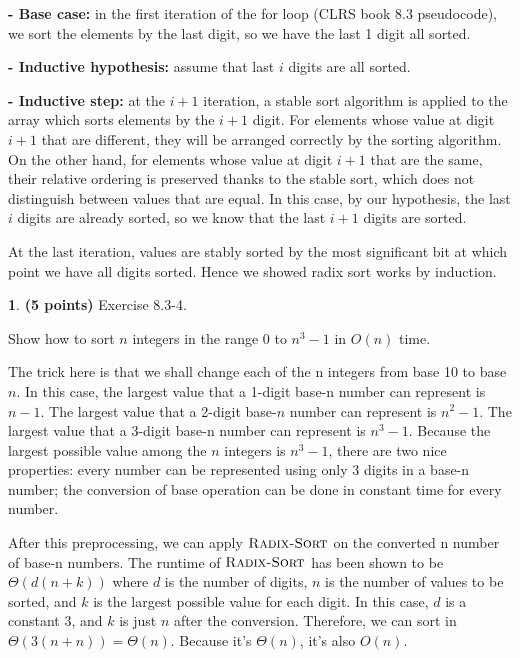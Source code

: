 \documentclass[11pt]{article}
\theoremstyle{definition}
\theoremstyle{theorem}
\newtheorem{prob}{}
\newcommand{\solution}{\medskip\noindent{\color{DarkBlue}\textbf{Solution:}}}
\begin{document}
\solution

\textbf{- Base case:} in the first iteration of the for loop (CLRS book 8.3 pseudocode), we sort the elements by the last digit, so we have the last 1 digit all sorted.

\textbf{- Inductive hypothesis:} assume that last $i$ digits are all sorted.

\textbf{- Inductive step:} at the $i+1$ iteration, a stable sort algorithm is applied to the array which sorts elements by the $i+1$ digit. For elements whose value at digit $i+1$ that are different, they will be arranged correctly by the sorting algorithm. On the other hand, for elements whose value at digit $i+1$ that are the same, their relative ordering is preserved thanks to the stable sort, which does not distinguish between values that are equal. In this case, by our hypothesis, the last $i$ digits are already sorted, so we know that the last $i+1$ digits are sorted.

At the last iteration, values are stably sorted by the most significant bit at which point we have all digits sorted. Hence we showed radix sort works by induction.


\newpage
\begin{prob} \textbf{(5 points)} Exercise 8.3-4.
\end{prob}
Show how to sort $n$ integers in the range 0 to $n^3-1$ in $O(n)$ time.

\solution

The trick here is that we shall change each of the n integers from base 10 to base $n$. In this case, the largest value that a 1-digit base-n number can represent is $n-1$. The largest value that a 2-digit base-$n$ number can represent is $n^2 - 1$. The largest value that a 3-digit base-n number can represent is $n^3-1$. Because the largest possible value among the $n$ integers is $n^3-1$, there are two nice properties: every number can be represented using only 3 digits in a base-n number; the conversion of base operation can be done in constant time for every number. 

After this preprocessing, we can apply $\textproc{\textsc{Radix-Sort}}$ on the converted n number of base-n numbers. The runtime of  $\textproc{\textsc{Radix-Sort}}$ has been shown to be $\Theta{(d(n+k))}$ where $d$ is the number of digits, $n$ is the number of values to be sorted, and $k$ is the largest possible value for each digit. In this case, $d$ is a constant 3, and $k$ is just $n$ after the conversion. Therefore, we can sort in $\Theta{(3(n+n))} = \Theta{(n)}$. Because it's $ \Theta{(n)}$, it's also $O(n)$.
\end{document}
